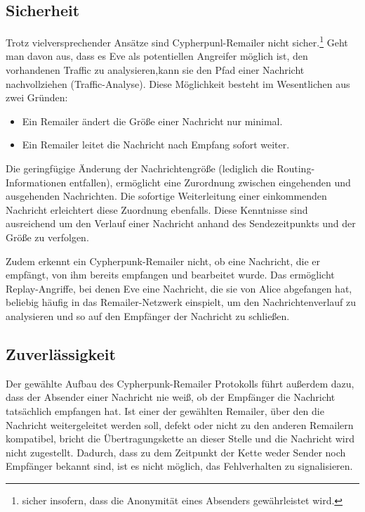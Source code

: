 \subsection{Sicherheit}
Trotz vielversprechender Ansätze sind Cypherpunl-Remailer nicht sicher.\footnote{sicher insofern, dass die Anonymität eines Absenders gewährleistet wird.}
Geht man davon aus, dass es Eve als potentiellen Angreifer möglich ist, den vorhandenen Traffic zu analysieren,kann sie den Pfad einer Nachricht nachvollziehen (Traffic-Analyse). Diese Möglichkeit besteht im Wesentlichen aus zwei Gründen: 
\begin{itemize}
\item Ein Remailer ändert die Größe einer Nachricht nur minimal.
\item Ein Remailer leitet die Nachricht nach Empfang sofort weiter.
\end{itemize}
Die geringfügige Änderung  der Nachrichtengröße (lediglich die Routing-Informationen entfallen), ermöglicht eine Zurordnung zwischen eingehenden und ausgehenden Nachrichten. Die sofortige Weiterleitung einer einkommenden Nachricht erleichtert diese Zuordnung ebenfalls. Diese Kenntnisse sind ausreichend um den Verlauf einer Nachricht anhand des Sendezeitpunkts und der Größe zu verfolgen.

Zudem erkennt ein Cypherpunk-Remailer nicht, ob eine Nachricht, die er empfängt, von ihm bereits empfangen und bearbeitet wurde. Das ermöglicht Replay-Angriffe, bei denen Eve eine Nachricht, die sie von Alice abgefangen hat, beliebig häufig in das Remailer-Netzwerk einspielt, um den Nachrichtenverlauf zu analysieren und so auf den Empfänger der Nachricht zu schließen.

\subsection{Zuverlässigkeit}
Der gewählte Aufbau des Cypherpunk-Remailer Protokolls führt außerdem dazu, dass der Absender einer Nachricht nie weiß, ob der Empfänger die Nachricht tatsächlich empfangen hat. Ist einer der gewählten Remailer, über den die Nachricht weitergeleitet werden soll, defekt oder nicht zu den anderen Remailern kompatibel, bricht die Übertragungskette an dieser Stelle und die Nachricht wird nicht zugestellt. Dadurch, dass zu dem Zeitpunkt der Kette weder Sender noch Empfänger bekannt sind, ist es nicht möglich, das Fehlverhalten zu signalisieren. 